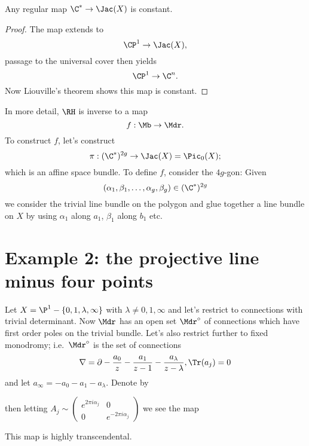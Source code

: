 \documentclass[etingof-dmod.tex]{subfiles}
\begin{document}
\begin{lem}
  Any regular map $\C^* \rightarrow \Jac(X)$ is constant.
\end{lem}
\begin{proof}
  The map extends to $$\CP^1 \rightarrow \Jac(X),$$ passage to the universal
  cover then yields $$\CP^1 \rightarrow \C^n.$$ Now Liouville's theorem shows
  this map is constant.
\end{proof}

In more detail, $\RH$ is inverse to a map $$f : \Mb \rightarrow \Mdr.$$ To
construct $f$, let's construct $$\pi: (\C^*)^{2g} \rightarrow \Jac(X) =
\Pic_{0}(X);$$ which is an affine space bundle. To define $f$, consider the
$4g$-gon:
Given $$(\alpha_1,\beta_1, \ldots, \alpha_g,\beta_g) \in (\C^*)^{2g}$$ we
consider the trivial line bundle on the polygon and glue
together a line bundle on $X$ by using $\alpha_1$ along $a_1$, $\beta_1$ along $b_1$ etc.
\section{Example 2: the projective line minus four points}
Let $X = \P^1 - \{0,1,\lambda, \infty\}$ with $\lambda \neq 0,1,\infty$ and
let's restrict to connections with trivial determinant. Now $\Mdr$ has an open
set $\Mdr^{\circ}$ of connections which have first order poles on the trivial
bundle. Let's also restrict further to fixed monodromy; i.e.\ $\Mdr^{\circ}$
is the set of connections $$\nabla  = \partial  - \frac{a_0}{z} -
\frac{a_1}{z-1} - \frac{a_{\lambda}}{z-\lambda}, \Tr(a_j)=0$$
and let $a_{\infty} = -a_0 -a_1 - a_{\lambda}$. Denote by

then letting $A_j \sim \begin{pmatrix} e^{2\pi i\alpha_j} & 0 \\
    0 & e^{-2\pi i \alpha_j}\end{pmatrix}$ we see the map
This map is highly transcendental.
\end{document}
